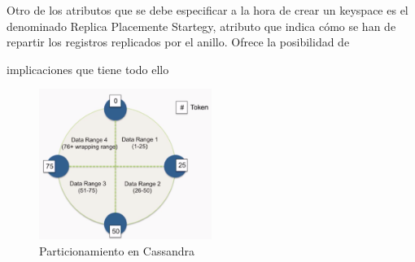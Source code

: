Otro de los atributos que se debe especificar a la hora de crear un keyspace es el denominado Replica Placemente Startegy, atributo que indica cómo se han de repartir los registros replicados por el anillo. Ofrece la posibilidad de 

implicaciones que tiene todo ello

\begin{figure}[h]
	\centering
	\includegraphics[width=0.5\textwidth]{Ilustraciones/cassandra_token.png}
	\caption{Particionamiento en Cassandra}
	\label{fig:cassandra_token}
\end{figure}







